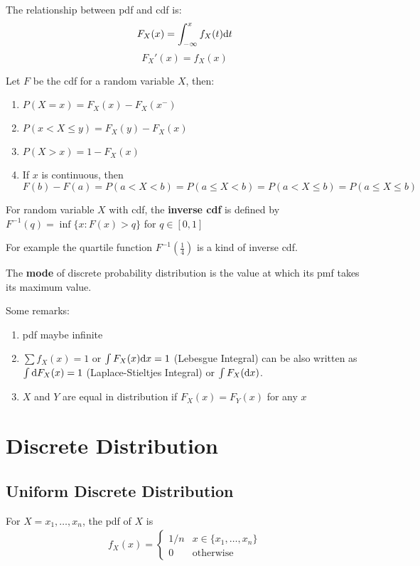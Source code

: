 The relationship between pdf and cdf is: 
$$F_X(x)=\int_{-\infty}^{x}f_X(t)\mathrm{d} t$$
$$F_X'(x)= f_X(x)$$


\begin{lemma}
	Let $F$ be the cdf for a random variable $X$, then:
	\begin{enumerate}[(1)]
		\item $P(X=x)=F_X(x)-F_X(x^-)$
		\item $P(x<X\leq y)=F_X(y)-F_X(x)$
		\item $P(X>x)=1-F_X(x)$
		\item If $x$ is continuous, then $F(b)-F(a)=P(a<X<b)=P(a\leq X<b)=P(a<X\leq b)=P(a\leq X\leq b)$
	\end{enumerate}
\end{lemma}

\begin{definition}
	For random variable $X$ with cdf, the \textbf{inverse cdf} is defined by $F^{-1}(q)=\inf \{x:F(x)>q\}$ for $q\in\left[0,1\right]$
\end{definition}

For example the quartile function $F^{-1}(\frac{1}{4})$ is a kind of inverse cdf.


\begin{definition}[Mode]
	The \textbf{mode} of discrete probability distribution is the value at which its pmf takes its maximum value.
\end{definition}

Some remarks:
\begin{enumerate}[(1)]
	\item pdf maybe infinite
	\item $\sum f_X(x)=1$ or $\int F_X(x)\mathrm{d} x=1$ (Lebesgue Integral) can be also written as $\int \mathrm{d} F_X(x)=1$ (Laplace-Stieltjes Integral) or $\int F_X(\mathrm{d} x)$. 
	\item $X$ and $Y$ are equal in distribution if $F_X(x)=F_Y(x)$ for any $x$
\end{enumerate}

\section{Discrete Distribution}
	\subsection{Uniform Discrete Distribution}
		For $X={x_1,\dots,x_n}$, the pdf of $X$ is
		\begin{eqnarray}
			f_X(x)=\left\{
			\begin{array}{ll}
				1/n & x\in \{x_1,\dots,x_n\}\\
				0   & \text{otherwise}
			\end{array}
			\right.
		\end{eqnarray}
